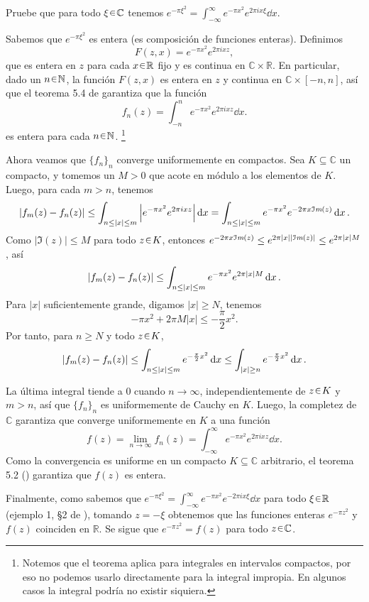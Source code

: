 \setcounter{eje}{3}
\begin{ejer}
Pruebe que para todo $\xi \en \mathbb{C}$ tenemos
\( e^{-\pi\xi^2} = \int_{-\infty}^{\infty} e^{-\pi x^2} e^{2\pi i x \xi} \dd{x} \).
\end{ejer}
\begin{sol}
Sabemos que $e^{-\pi\xi^2}$ es entera (es composición de funciones enteras). Definimos 
\[
F(z,x) = e^{-\pi x^2} e^{2\pi i x z},
\]
que es entera en $z$ para cada $x\en\mathbb{R}$ fijo y es continua en $\mathbb{C} \times \mathbb{R}$. En particular, dado un $n\en\mathbb{N}$, la función $F(z,x)$ es entera en $z$ y continua en $\mathbb{C}\times[-n,n]$, así que el teorema 5.4 de \cite{stein} garantiza que la función
\[
f_n(z) = \int_{-n}^{n} e^{-\pi x^2} e^{2\pi i x z} \dd{x}.
\]
es entera para cada $n\en\mathbb{N}$.%
\footnote{
    Notemos que el teorema aplica para integrales en intervalos compactos, por eso no podemos usarlo directamente para la integral impropia. En algunos casos la integral podría no existir siquiera.
}\par
Ahora veamos que $\{f_n\}_n$ converge uniformemente en compactos. Sea $K\subseteq\mathbb{C}$ un compacto, y tomemos un $M>0$ que acote en módulo a los elementos de $K$. Luego, para cada $m > n$, tenemos
\[
\abs{f_m(z) - f_n(z)}  \le \int_{n \le |x| \le m} \abs{e^{-\pi x^2} e^{2\pi i x z}} \dd{x} = \int_{n \le |x| \le m} e^{-\pi x^2} e^{-2\pi x \mathcal{I}\textit{m}(z)} \dd{x}.
\]
Como $|\Im(z)| \le M$ para todo $z \en K$, entonces $e^{-2\pi x \mathcal{I}\textit{m}(z)} \leq e^{2\pi\abs{x} \abs{\mathcal{I}\textit{m}(z)}} \leq e^{2\pi |x| M}$, así
\[
\abs{f_m(z) - f_n(z)} \le \int_{n \le |x| \le m} e^{-\pi x^2} e^{2\pi |x| M} \dd{x}.
\]
Para $|x|$ suficientemente grande, digamos $|x| \ge N$, tenemos
\[
-\pi x^2 + 2\pi M|x| \le -\frac{\pi}{2} x^2.
\]
Por tanto, para $n \ge N$ y todo $z \en K$,
\[
\abs{f_m(z) - f_n(z)}  \le \int_{n \le |x| \le m} e^{-\frac{\pi}{2} x^2} \dd{x} \le \int_{|x| \ge n} e^{-\frac{\pi}{2} x^2} \dd{x}.
\]

La última integral tiende a $0$ cuando $n \to \infty$, independientemente de $z \en K$ y $m > n$, así que $\{f_n\}_n$ es uniformemente de Cauchy en $K$. Luego, la completez de $\mathbb{C}$ garantiza que converge uniformemente en $K$ a una función
\[
f(z) = \lim_{n\to\infty} f_n(z) = \int_{-\infty}^{\infty} e^{-\pi x^2} e^{2\pi i x z} \dd{x}.
\]
Como la convergencia es uniforme en un compacto $K \subseteq \mathbb{C}$ arbitrario, el teorema 5.2 (\cite{stein}) garantiza que $f(z)$ es entera. 

Finalmente, como sabemos que $e^{-\pi\xi^2} = \int_{-\infty}^{\infty} e^{-\pi x^2} e^{-2\pi i x \xi} \dd{x}$ para todo $\xi\en\mathbb{R}$ (ejemplo 1, \S 2 de \cite{stein}), tomando $z = -\xi$ obtenemos que las funciones enteras $e^{-\pi z^2}$ y $f(z)$ coinciden en $\mathbb{R}$. Se sigue que $e^{-\pi z^2}=f(z)$ para todo $z\en\mathbb{C}$.
\end{sol}